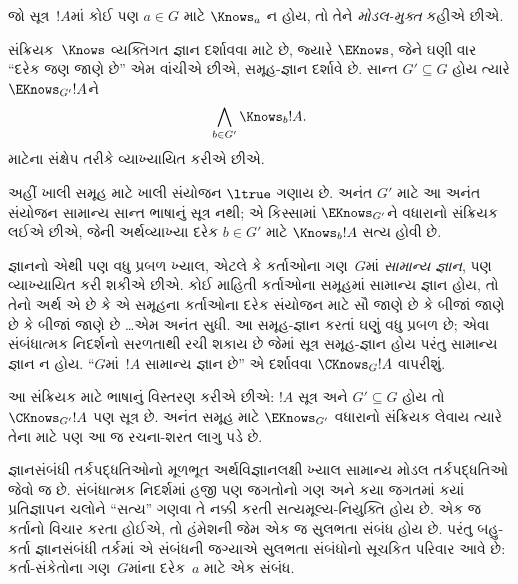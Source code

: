જો સૂત્ર~$!A$માં કોઈ પણ $a\in G$ માટે $\Knows_a$ ન હોય, તો તેને
\emph{મોડલ-મુક્ત} કહીએ છીએ.

\begin{defn}
  સંક્રિયક~$\Knows$ વ્યક્તિગત જ્ઞાન દર્શાવવા માટે છે, જ્યારે
  $\EKnows$, જેને ઘણી વાર ``દરેક જણ જાણે છે'' એમ વાંચીએ છીએ,
  સમૂહ-જ્ઞાન દર્શાવે છે. સાન્ત $G' \subseteq G$ હોય ત્યારે
  $\EKnows_{G'} !A$ને \[\bigwedge_{b \in G'} \Knows_b !A.\]
  માટેના સંક્ષેપ તરીકે વ્યાખ્યાયિત કરીએ છીએ.
\end{defn}

અહીં ખાલી સમૂહ માટે ખાલી સંયોજન $\ltrue$ ગણાય છે.
અનંત $G'$ માટે આ અનંત સંયોજન સામાન્ય સાન્ત ભાષાનું સૂત્ર
નથી; એ કિસ્સામાં $\EKnows_{G'}$ને વધારાનો સંક્રિયક લઈએ છીએ,
જેની અર્થવ્યાખ્યા દરેક $b\in G'$ માટે $\Knows_b !A$ સત્ય હોવી છે.

જ્ઞાનનો એથી પણ વધુ પ્રબળ ખ્યાલ, એટલે કે કર્તાઓના ગણ~$G$માં
\emph{સામાન્ય જ્ઞાન}, પણ વ્યાખ્યાયિત કરી શકીએ છીએ. કોઈ માહિતી
કર્તાઓના સમૂહમાં સામાન્ય જ્ઞાન હોય, તો તેનો અર્થ એ છે કે એ સમૂહના
કર્તાઓના દરેક સંયોજન માટે સૌ જાણે છે કે બીજાં જાણે છે કે બીજાં
જાણે છે \dots એમ અનંત સુધી. આ સમૂહ-જ્ઞાન કરતાં ઘણું વધુ પ્રબળ
છે; એવા સંબંધાત્મક નિદર્શનો સરળતાથી રચી શકાય છે જેમાં
સૂત્ર સમૂહ-જ્ઞાન હોય પરંતુ સામાન્ય જ્ઞાન ન હોય.
``$G$માં~$!A$ સામાન્ય જ્ઞાન છે'' એ દર્શાવવા
$\CKnows_G !A$ વાપરીશું.

આ સંક્રિયક માટે ભાષાનું વિસ્તરણ કરીએ છીએ: $!A$ સૂત્ર અને
$G'\subseteq G$ હોય તો $\CKnows_{G'}!A$ પણ સૂત્ર છે.
અનંત સમૂહ માટે $\EKnows_{G'}$ વધારાનો સંક્રિયક લેવાય ત્યારે
તેના માટે પણ આ જ રચના-શરત લાગુ પડે છે.

\endgroup

\begingroup
\makeatletter{}\makeatother


\label{guunit:OLP-0485}


જ્ઞાનસંબંધી તર્કપદ્ધતિઓનો મૂળભૂત અર્થવિજ્ઞાનલક્ષી ખ્યાલ સામાન્ય
મોડલ તર્કપદ્ધતિઓ જેવો જ છે. સંબંધાત્મક નિદર્શમાં હજી પણ જગતોનો
ગણ અને કયા જગતમાં કયાં પ્રતિજ્ઞાપન ચલોને ``સત્ય'' ગણવા તે નક્કી કરતી સત્યમૂલ્ય-નિયુક્તિ હોય છે. એક જ
કર્તાનો વિચાર કરતા હોઈએ, તો હંમેશની જેમ એક જ સુલભતા સંબંધ
હોય છે. પરંતુ બહુ-કર્તા જ્ઞાનસંબંધી તર્કમાં એ સંબંધની જગ્યાએ
સુલભતા સંબંધોનો સૂચકિત પરિવાર આવે છે: કર્તા-સંકેતોના ગણ~$G$માંના દરેક~$a$
માટે એક સંબંધ.

